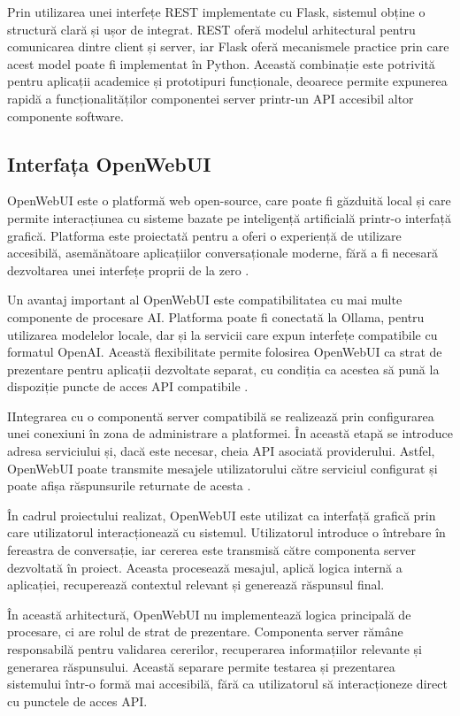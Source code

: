 \documentclass[12pt, a4paper, oneside, romanian]{teza-upb}
\begin{document}
Prin utilizarea unei interfețe REST implementate cu Flask, sistemul obține o structură clară și ușor de integrat. REST oferă modelul arhitectural pentru comunicarea dintre client și server, iar Flask oferă mecanismele practice prin care acest model poate fi implementat în Python. Această combinație este potrivită pentru aplicații academice și prototipuri funcționale, deoarece permite expunerea rapidă a  funcționalităților componentei server printr-un API accesibil altor componente software.


\subsection{Interfața OpenWebUI}

OpenWebUI este o platformă web open-source, care poate fi găzduită local și care permite interacțiunea cu sisteme bazate pe inteligență artificială printr-o interfață grafică. Platforma este proiectată pentru a oferi o experiență de utilizare accesibilă, asemănătoare aplicațiilor conversaționale moderne, fără a fi necesară dezvoltarea unei interfețe proprii de la zero \cite{openwebui_doc}.

Un avantaj important al OpenWebUI este compatibilitatea cu mai multe componente de procesare AI. Platforma poate fi conectată la Ollama, pentru utilizarea modelelor locale, dar și la servicii care expun interfețe compatibile cu formatul OpenAI. Această flexibilitate permite folosirea OpenWebUI ca strat de prezentare pentru aplicații dezvoltate separat, cu condiția ca acestea să pună la dispoziție puncte de acces API compatibile \cite{openwebui_doc}.

IIntegrarea cu o componentă server compatibilă se realizează prin configurarea unei conexiuni în zona de administrare a platformei. În această etapă se introduce adresa serviciului și, dacă este necesar, cheia API asociată providerului. Astfel, OpenWebUI poate transmite mesajele utilizatorului către serviciul configurat și poate afișa răspunsurile returnate de acesta \cite{openwebui_openai_compatible}.

În cadrul proiectului realizat, OpenWebUI este utilizat ca interfață grafică prin care utilizatorul interacționează cu sistemul. Utilizatorul introduce o întrebare în fereastra de conversație, iar cererea este transmisă către componenta server dezvoltată în proiect. Aceasta procesează mesajul, aplică logica internă a aplicației, recuperează contextul relevant și generează răspunsul final.

În această arhitectură, OpenWebUI nu implementează logica principală de procesare, ci are rolul de strat de prezentare. Componenta server rămâne responsabilă pentru validarea cererilor, recuperarea informațiilor relevante și generarea răspunsului. Această separare permite testarea și prezentarea sistemului într-o formă mai accesibilă, fără ca utilizatorul să interacționeze direct cu punctele de acces API.
\end{document}
